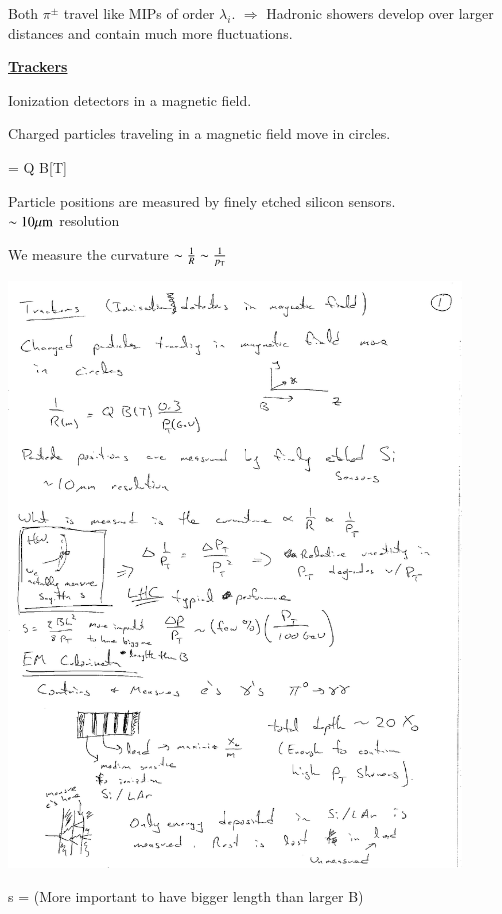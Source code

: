 {Both $\pi^\pm$ travel like MIPs of order $\lambda_i$.
$\Rightarrow$ Hadronic showers develop over larger distances and contain much more fluctuations.

\lineacross

\textbf{\underline{Trackers}}

Ionization detectors in a magnetic field.

Charged particles traveling in a magnetic field move in circles. 

\be
{} = Q \cdot B[T] \cdot {}
\ee

Particle positions are measured by finely etched silicon sensors.\\
$\sim10 \mu\textrm{m}$ resolution

We measure the curvature $\sim \frac{1}{R} \sim \frac{1}{p_{\textrm{T}}}$

\begin{minipage}{0.3\textwidth}
\bc
\includegraphics[width=0.9\textwidth]{./Sagitta.pdf}
\ec
\end{minipage}\hfill
\begin{minipage}{0.7\textwidth}
\be
s  = 
\ee
(More important to have bigger length than larger B)


\end{minipage}}
